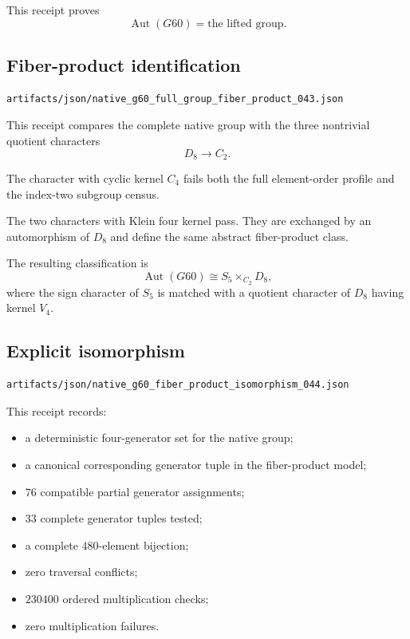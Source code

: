 This receipt proves
\[
\operatorname{Aut}(G60)
=
\text{the lifted group}.
\]

\subsection{Fiber-product identification}

\begin{verbatim}
artifacts/json/native_g60_full_group_fiber_product_043.json
\end{verbatim}

This receipt compares the complete native group with the three
nontrivial quotient characters
\[
D_8\longrightarrow C_2.
\]

The character with cyclic kernel $C_4$ fails both the full element-order
profile and the index-two subgroup census.

The two characters with Klein four kernel pass. They are exchanged by
an automorphism of $D_8$ and define the same abstract fiber-product
class.

The resulting classification is
\[
\operatorname{Aut}(G60)
\cong
S_5\times_{C_2}D_8,
\]
where the sign character of $S_5$ is matched with a quotient character
of $D_8$ having kernel $V_4$.

\subsection{Explicit isomorphism}

\begin{verbatim}
artifacts/json/native_g60_fiber_product_isomorphism_044.json
\end{verbatim}

This receipt records:

\begin{itemize}
\item a deterministic four-generator set for the native group;
\item a canonical corresponding generator tuple in the fiber-product
model;
\item $76$ compatible partial generator assignments;
\item $33$ complete generator tuples tested;
\item a complete $480$-element bijection;
\item zero traversal conflicts;
\item $230400$ ordered multiplication checks;
\item zero multiplication failures.
\end{itemize}

